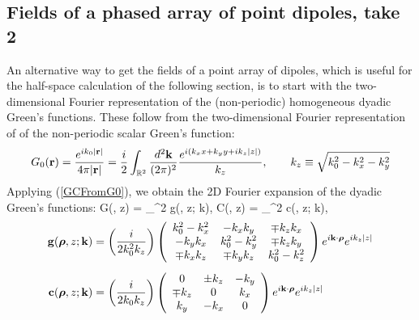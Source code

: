\documentclass[letterpaper]{article}
\begin{document}
\subsection*{Fields of a phased array of point dipoles, take 2}

An alternative way to get the fields of a point array of dipoles,
which is useful for the half-space calculation of the following
section, is to start with the two-dimensional Fourier representation 
of the (non-periodic) homogeneous dyadic Green's functions.
These follow from the two-dimensional Fourier representation of 
of the non-periodic scalar Green's function:
$$ G_0(\mathbf{r})=\frac{e^{ik_0 |\mathbf{r}|}}{4\pi |\mathbf{r}|}
   =
   \frac{i}{2}
   \int_{\mathbb R^2} \frac{d^2 \mathbf{k}}{(2\pi)^2}
    \frac{e^{i(k_x x + k_y y + ik_z|z|)}}{k_z},
   \qquad
   k_z\equiv \sqrt{k_0^2 - k_x^2 - k_y^2}
$$
Applying (\ref{GCFromG0}), 
we obtain the 2D Fourier expansion of the dyadic Green's functions:
{
\vb G(\vbrho, z)
 = \int_{^2}
      \vb g(\vbrho, z; \vb k),
\qquad
\vb C(\vbrho, z)
 = \int_{^2}
      \vb c(\vbrho, z; \vb k),
}
\begin{subequations}
\begin{align}
\mathbf{g}(\boldsymbol{\rho}, z; \mathbf{k})
&= \left(\frac{i}{2k_0^2 k_z}\right)
   \left(\begin{array}{ccc}
    k_0^2-k_x^2      & -k_x k_y     & \mp k_z k_x \\
    -k_y k_x         & k_0^2-k_y^2  & \mp k_z k_y \\
    \mp  k_x k_z     & \mp k_y k_z  & k_0^2-k_z^2
    \end{array}\right) e^{i\mathbf{k} \cdot \boldsymbol{\rho}} e^{i k_z |z|}
\\[5pt]
\mathbf{c}(\boldsymbol{\rho}, z; \mathbf{k})
 &= \left(\frac{i}{2k_0 k_z}\right)
     \left(\begin{array}{ccc}
         0 & \pm k_z & -k_y \\
  \mp k_z  & 0       &  k_x \\
      k_y  & -k_x    &  0 
     \end{array}\right) e^{i\mathbf{k} \cdot \boldsymbol{\rho}} e^{i k_z |z|}
\end{align}
\label{gc}
\end{subequations}
\end{document}
